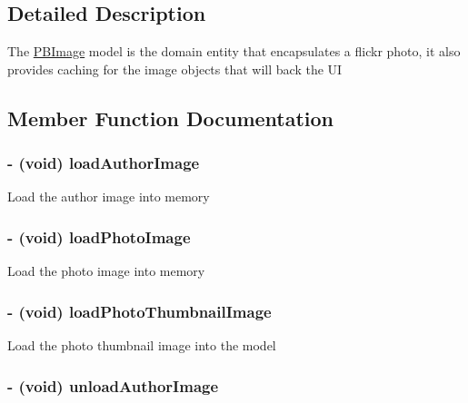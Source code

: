 \subsection{Detailed Description}
The \hyperlink{interface_p_b_image}{PBImage} model is the domain entity that encapsulates a flickr photo, it also provides caching for the image objects that will back the UI 

\subsection{Member Function Documentation}
\hypertarget{interface_p_b_image_a4af15f2a0b22a1cb6fb88aafbc7fa2d5}{
\subsubsection[{loadAuthorImage}]{\setlength{\rightskip}{0pt plus 5cm}-\/ (void) loadAuthorImage }}
\label{interface_p_b_image_a4af15f2a0b22a1cb6fb88aafbc7fa2d5}
Load the author image into memory \hypertarget{interface_p_b_image_a97e942803d2815e8cf393da6c6d8c78e}{
\subsubsection[{loadPhotoImage}]{\setlength{\rightskip}{0pt plus 5cm}-\/ (void) loadPhotoImage }}
\label{interface_p_b_image_a97e942803d2815e8cf393da6c6d8c78e}
Load the photo image into memory \hypertarget{interface_p_b_image_a002ec7944ae9c0e779867a42af048945}{
\subsubsection[{loadPhotoThumbnailImage}]{\setlength{\rightskip}{0pt plus 5cm}-\/ (void) loadPhotoThumbnailImage }}
\label{interface_p_b_image_a002ec7944ae9c0e779867a42af048945}
Load the photo thumbnail image into the model \hypertarget{interface_p_b_image_a309bbbd97bdb73cd5ce68b85dd10d2ef}{
\subsubsection[{unloadAuthorImage}]{\setlength{\rightskip}{0pt plus 5cm}-\/ (void) unloadAuthorImage }}
